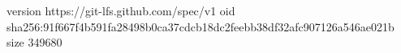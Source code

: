 version https://git-lfs.github.com/spec/v1
oid sha256:91f667f4b591fa28498b0ca37cdcb18dc2feebb38df32afc907126a546ae021b
size 349680
